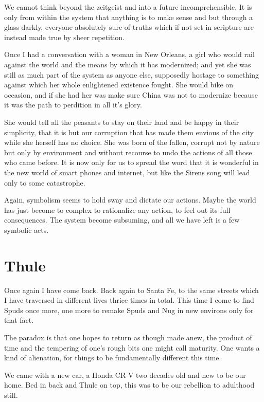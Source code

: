 \documentclass[ebook, 10pt, openright, onecolumn]{memoir}
\begin{document}
We cannot think beyond the zeitgeist and into a future incomprehensible.  It is
only from within the system that anything is to make sense and but through a
glass darkly, everyone absolutely sure of truths which if not set in scripture
are instead made true by sheer repetition.  

Once I had a conversation with a woman in New Orleans, a girl who would rail
against the world and the means by which it has modernized; and yet she was
still as much part of the system as anyone else, supposedly hostage to something
against which her whole enlightened existence fought.  She would bike on
occasion, and if she had her was make sure China was not to modernize because it
was the path to perdition in all it's glory.

She would tell all the peasants to stay on their land and be happy in their
simplicity, that it is but our corruption that has made them envious of the city
while she herself has no choice.  She was born of the fallen, corrupt not by
nature but only by environment and without recourse to undo the actions of all
those who came before.  It is now only for us to spread the word that it is
wonderful in the new world of smart phones and internet, but like the Sirens
song will lead only to some catastrophe.


Again, symbolism seems to hold sway and dictate our actions.  Maybe the world
has just become to complex to rationalize any action, to feel out its full
consequences.  The system become subsuming, and all we have left is a few
symbolic acts.

\chapter{Thule}
\label{cha:thule}

Once again I have come back.  Back again to Santa Fe, to the same streets which
I have traversed in different lives thrice times in total.  This time I come to
find Spuds once more, one more to remake Spuds and Nug in new environs only for
that fact.

The paradox is that one hopes to return as though made anew, the product of time
and the tempering of one's rough bits one might call maturity.  One wants a kind
of alienation, for things to be fundamentally different this time.  

We came with a new car, a Honda CR-V two decades old and new to be our home.
Bed in back and Thule on top, this was to be our rebellion to adulthood still.
\end{document}
